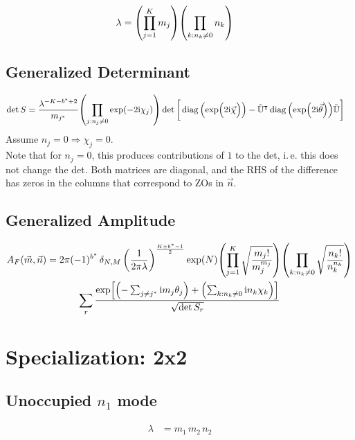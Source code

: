 \documentclass[
	english,
	a4paper,
	fontsize=10pt,
	parskip=half,
	titlepage=true,
	DIV=12,
	final
]{scrreprt}
\newcommand*{\ie}{i.\,e.\xspace}
\newcommand*{\Thus}{\ensuremath{\Rightarrow}\xspace}
\newcommand*{\transp}{\ensuremath{^\intercal}}
\newcommand*{\iunit}{\ensuremath{\mathrm{i}}}
\DeclareMathOperator{\diag}{diag}
\begin{document}
\begin{align}
	\lambda
&=
	\qty( \prod_{j = 1}^{K}      m_j )
	\qty( \prod_{k : n_k \neq 0} n_k )
\label{eqn:DefLambdaNonBZO_n}
\end{align}

\subsection{Generalized Determinant}
\begin{align}
	\det S
&=
	\frac{ \lambda^{-K - b^* + 2} }{ m_{j^*} }
	\qty( \prod_{j: n_j \neq 0} \exp(-2\iunit \chi_j) )
	\det\qty[\bigg.
		\diag\qty(\exp(\Big.2\iunit\vec{\chi}))
		-
		\tilde{\mathbb{U}}\transp
		\diag\qty(\exp(2\iunit\vec{\theta}))
		\tilde{\mathbb{U}}
	]
\label{eqn:detSNonBZO_n}
\end{align}
Assume $n_j = 0 \Thus \chi_j = 0$.\\

Note that for $n_j = 0$, this produces contributions of $1$ to the det, \ie this does not change the det. Both matrices are diagonal, and the RHS of the difference has zeros in the columns that correspond to ZOs in $\vec{n}$.

\subsection{Generalized Amplitude}
\begin{multline}
	A_F(\vec{m}, \vec{n})
=
	2\pi (-1)^{b^*} \, \delta_{N,M} \, \qty(
		\frac{1}{2\pi\lambda}
	)^{\frac{K + b^* - 1}{2}}
	\exp(N)
	\qty( \prod_{j = 1}^{K}
		\sqrt{\frac
			{ m_j! }
			{ m_j^{m_j} }
	})
	\qty( \prod_{k : n_k \neq 0}
		\sqrt{\frac
			{ n_k! }
			{ n_k^{n_k} }
	})
\\
	\sum_r
		\frac
		{\exp[
			\qty(- \sum_{j\neq j^*}      \iunit m_j \theta_j) + 
			\qty(  \sum_{k : n_k \neq 0} \iunit n_k \chi  _k)
		]}
		{\sqrt{\det S_r}}
\end{multline}

\section{Specialization: 2x2}
\subsection{Unoccupied $n_1$ mode}
\begin{align}
	\lambda
&=
	m_1 \, m_2 \, n_2
\end{align}
\end{document}
